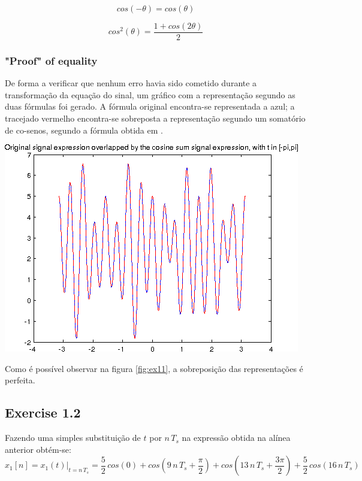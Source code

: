 \documentclass[a4paper]{article}
\begin{document}
\begin{equation}
cos(-\theta) = cos(\theta)
\tag{7 to 8}
\end{equation}

\begin{equation}
cos^2(\theta) = \frac{1 + cos(2 \theta)}{2}
\tag{8 to 9}
\end{equation}

\subsubsection{"Proof" of equality}
\noindent De forma a verificar que nenhum erro havia sido cometido durante a transformação da equação do sinal, um gráfico com a representação segundo as duas fórmulas foi gerado. A fórmula original encontra-se representada a azul; a tracejado vermelho encontra-se sobreposta a representação segundo um somatório de co-senos, segundo a fórmula obtida em \emph{}.

\begin{center}
	\includegraphics[scale=0.45]{images/ex11.png}
	\label{fig:ex11}
\end{center}

\noindent Como é possível observar na figura \ref{fig:ex11}, a sobreposição das representações é perfeita.

\subsection{Exercise 1.2}
Fazendo uma simples substituição de $t$ por $n \, T_{s}$ na expressão obtida na alínea anterior obtém-se:
\begin{equation}
	x_{1}[n] = x_{1}(t) |_{t = n \, T_{s}} = \frac{5}{2} \, cos(0) + cos\left(9 \, n \, T_{s} + \frac{\pi}{2}\right) + cos\left(13 \, n \, T_{s} + \frac{3 \pi}{2}\right) + \frac{5}{2} \, cos(16 \, n \, T_{s})
\end{equation}
\end{document}
